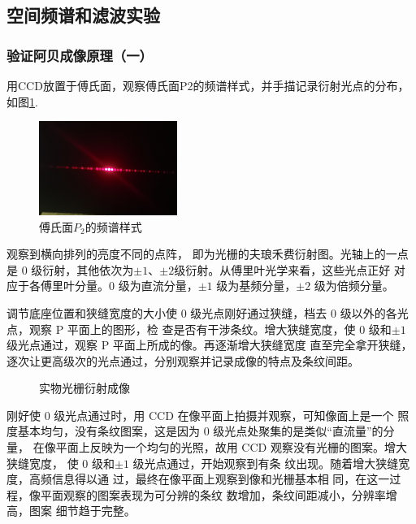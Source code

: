 \documentclass[10pt,a4paper,twoside,UTF8]{ctexart}
\begin{document}
\subsection{空间频谱和滤波实验}
\subsubsection{验证阿贝成像原理（一）}
用CCD放置于傅氏面，观察傅氏面P2的频谱样式，并手描记录衍射光点的分布，如图\ref{fig:ab1_raw}.
\begin{figure}[H]
	\centering
	\includegraphics[width=0.4\textwidth]{C7.2/1/raw.png}
	\caption{傅氏面$P_2$的频谱样式}
	\label{fig:ab1_raw}
\end{figure}

观察到横向排列的亮度不同的点阵，
即为光栅的夫琅禾费衍射图。光轴上的一点
是 0 级衍射，其他依次为$\pm 1$、$\pm 2$级衍射。从傅里叶光学来看，这些光点正好
对应于各傅里叶分量。0 级为直流分量，$\pm 1$
级为基频分量，$\pm 2$ 级为倍频分量。

调节底座位置和狭缝宽度的大小使 0 级光点刚好通过狭缝，档去 0 级以外的各光点，观察 P 平面上的图形，检
查是否有干涉条纹。增大狭缝宽度，使 0 级和$\pm 1$ 级光点通过，观察 P 平面上所成的像。再逐渐增大狭缝宽度
直至完全拿开狭缝，逐次让更高级次的光点通过，分别观察并记录成像的特点及条纹间距。
\begin{figure}[H]
	\centering

	\caption{实物光栅衍射成像}
	\label{fig:ab1}
\end{figure}

刚好使 0 级光点通过时，用 CCD
在像平面上拍摄并观察，可知像面上是一个
照度基本均匀，没有条纹图案，这是因为 0
级光点处聚集的是类似“直流量”的分量，
在像平面上反映为一个均匀的光照，故用
CCD 观察没有光栅的图案。增大狭缝宽度，
使 0 级和$\pm 1$ 级光点通过，开始观察到有条
纹出现。随着增大狭缝宽度，高频信息得以通
过，最终在像平面上观察到像和光栅基本相
同，在这一过程，像平面观察的图案表现为可分辨的条纹
数增加，条纹间距减小，分辨率增高，图案
细节趋于完整。
\end{document}
